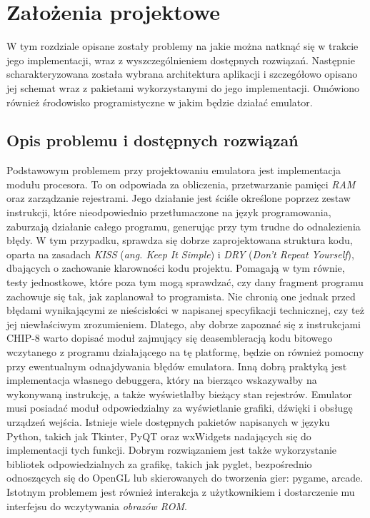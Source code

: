 \section{Założenia projektowe}
W tym rozdziale opisane zostały problemy na jakie można natknąć się w trakcie jego implementacji, wraz z wyszczególnieniem dostępnych rozwiązań. Następnie scharakteryzowana została wybrana architektura aplikacji i szczegółowo opisano jej schemat wraz z pakietami wykorzystanymi do jego implementacji. Omówiono również środowisko programistyczne w jakim będzie działać emulator.

\subsection{Opis problemu i dostępnych rozwiązań}
Podstawowym problemem przy projektowaniu emulatora jest implementacja modułu procesora. To on odpowiada za obliczenia, przetwarzanie pamięci \textit{RAM} oraz zarządzanie rejestrami. Jego działanie jest ściśle określone poprzez zestaw instrukcji, które nieodpowiednio przetłumaczone na język programowania, zaburzają działanie całego programu, generując przy tym trudne do odnalezienia błędy. W tym przypadku, sprawdza się dobrze zaprojektowana struktura kodu, oparta na zasadach \textit{KISS} (\textit{ang. \textit{Keep It Simple}}) i \textit{DRY} (\textit{Don't Repeat Yourself}), dbających o zachowanie klarowności kodu projektu. Pomagają w tym równie, testy jednostkowe, które poza tym mogą sprawdzać, czy dany fragment programu zachowuje się tak, jak zaplanował to programista. Nie chronią one jednak przed błędami wynikającymi ze nieścisłości w  napisanej specyfikacji technicznej, czy też jej niewłaściwym zrozumieniem. Dlatego, aby dobrze zapoznać się z instrukcjami CHIP-8 warto dopisać moduł zajmujący się deasembleracją kodu bitowego wczytanego z programu działającego na tę platformę, będzie on również pomocny przy ewentualnym odnajdywania błędów emulatora. Inną dobrą praktyką jest implementacja własnego debuggera, który na bierząco wskazywałby na wykonywaną instrukcję, a także wyświetlałby bieżący stan rejestrów.
Emulator musi posiadać moduł odpowiedzialny za wyświetlanie grafiki, dźwięki i obsługę urządzeń wejścia. Istnieje wiele dostępnych pakietów napisanych w języku Python, takich jak Tkinter, PyQT oraz wxWidgets nadających się do implementacji tych funkcji. Dobrym rozwiązaniem jest także wykorzystanie bibliotek odpowiedzialnych za grafikę, takich jak pyglet, bezpośrednio odnoszących się do OpenGL lub skierowanych do tworzenia gier: pygame, arcade.
Istotnym problemem jest również interakcja z użytkownikiem i dostarczenie mu interfejsu do wczytywania \textit{obrazów ROM}.

